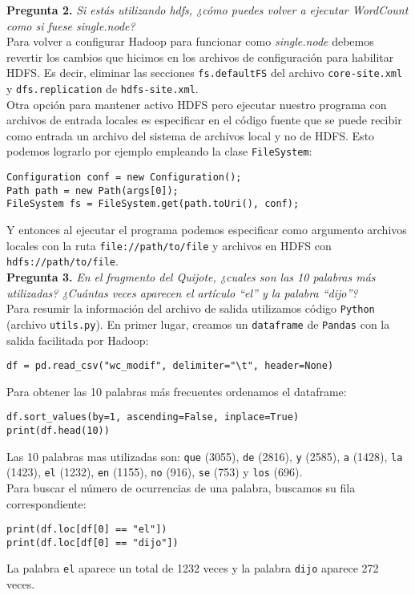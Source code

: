 \documentclass[11pt]{article}
\begin{document}
\textbf{Pregunta 2. }\emph{Si estás utilizando hdfs, ¿cómo puedes volver a ejecutar WordCount como si fuese single.node?}\\

Para volver a configurar Hadoop para funcionar como \textit{single.node} debemos revertir los cambios que hicimos en los archivos de configuración para habilitar HDFS. Es decir, eliminar las secciones \texttt{fs.defaultFS} del archivo \texttt{core-site.xml} y \texttt{dfs.replication} de \texttt{hdfs-site.xml}.\\

Otra opción para mantener activo HDFS pero ejecutar nuestro programa con archivos de entrada locales es especificar en el código fuente que se puede recibir como entrada un archivo del sistema de archivos local y no de HDFS. Esto podemos lograrlo por ejemplo empleando la clase \verb|FileSystem|:

\begin{verbatim}
Configuration conf = new Configuration();
Path path = new Path(args[0]);
FileSystem fs = FileSystem.get(path.toUri(), conf);
\end{verbatim}

Y entonces al ejecutar el programa podemos especificar como argumento archivos locales con la ruta \verb|file://path/to/file| y archivos en HDFS con \verb|hdfs://path/to/file|.\\

\textbf{Pregunta 3. }\emph{En el fragmento del Quijote, ¿cuales son las 10 palabras más utilizadas? ¿Cuántas veces aparecen el artículo ``el'' y la palabra ``dijo''?}\\

Para resumir la información del archivo de salida utilizamos código \texttt{Python} (archivo \verb|utils.py|). En primer lugar, creamos un \verb|dataframe| de \texttt{Pandas} con la salida facilitada por Hadoop:
\begin{verbatim}
df = pd.read_csv("wc_modif", delimiter="\t", header=None)
\end{verbatim}

Para obtener las 10 palabras más frecuentes ordenamos el dataframe:
\begin{verbatim}
df.sort_values(by=1, ascending=False, inplace=True)
print(df.head(10))
\end{verbatim}

Las 10 palabras mas utilizadas son: \texttt{que} (3055), \texttt{de} (2816), \texttt{y} (2585), \texttt{a} (1428), \texttt{la} (1423), \texttt{el} (1232), \texttt{en} (1155), \texttt{no} (916), \texttt{se} (753) y \texttt{los} (696).\\

Para buscar el número de ocurrencias de una palabra, buscamos su fila correspondiente:
\begin{verbatim}
print(df.loc[df[0] == "el"])
print(df.loc[df[0] == "dijo"])
\end{verbatim}

La palabra \texttt{el} aparece un total de 1232 veces y la palabra \texttt{dijo} aparece 272 veces.
\end{document}
